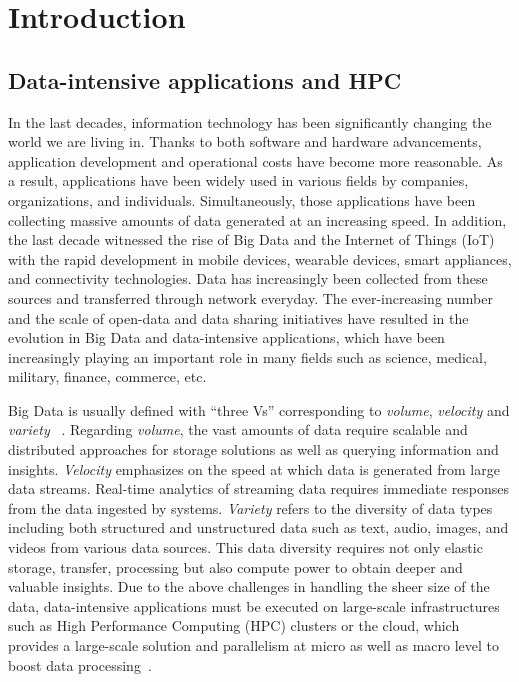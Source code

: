 \chapter{Introduction}
\label{introduction}

\section{Data-intensive applications and HPC}

In the last decades, information technology has been significantly changing the 
world we are living in. 
Thanks to both software and hardware advancements, application development 
and operational costs have become more reasonable. 
As a result,  applications have been widely used in various fields by companies, 
organizations, and individuals. Simultaneously, those applications have been 
collecting massive amounts of data generated at an increasing speed.
In addition, the last decade witnessed the rise of Big Data and the Internet of Things (IoT) with the rapid 
development in mobile devices, wearable devices, smart appliances, 
and connectivity technologies. Data has increasingly been collected from 
these sources and transferred through network everyday. 
The ever-increasing number and the scale of open-data and data sharing initiatives 
have resulted in the evolution in Big Data and data-intensive applications, 
which have been increasingly playing an important role in many fields such as 
science, medical, military, finance, commerce, etc.

Big Data is usually defined with ``three Vs'' corresponding to \textit{volume}, 
\textit{velocity} and \textit{variety} ~\cite{de2016formal}.  
Regarding \textit{volume}, the vast amounts of data require scalable and distributed 
approaches for storage solutions as well as querying information and insights.  
\textit{Velocity} emphasizes on the speed at which data is generated from large data 
streams. Real-time analytics of streaming data requires immediate responses 
from the data ingested by systems.
\textit{Variety} refers to the diversity of data types including both structured and 
unstructured data such as text, audio, images, and videos from various data sources.
This data diversity requires not only elastic storage, transfer, processing but also 
compute power to obtain deeper and valuable insights.  
Due to the above challenges in handling the sheer size of the data, data-intensive 
applications must be executed on large-scale infrastructures such as High Performance 
Computing (HPC) clusters or the cloud, which provides a large-scale solution 
and parallelism at micro as well as macro level to boost data 
processing~\cite{philipchen2014}.


